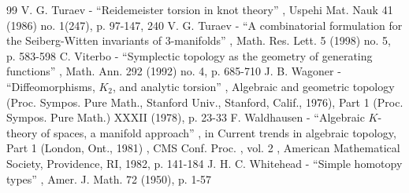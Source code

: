 \documentclass[11pt]{article}
\numberwithin{equation}{section}\providecommand{\dpl}{\displaystyle}
\begin{document}
\begin{thebibliography}{99}
 V. G. Turaev - “Reidemeister torsion in knot theory” , Uspehi Mat. Nauk 41 (1986) no. 1(247), p. 97-147, 240
 V. G. Turaev - “A combinatorial formulation for the Seiberg-Witten invariants of $3$-manifolds” , Math. Res. Lett. 5 (1998) no. 5, p. 583-598
 C. Viterbo - “Symplectic topology as the geometry of generating functions” , Math. Ann. 292 (1992) no. 4, p. 685-710
 J. B. Wagoner - “Diffeomorphisms, $K_{2}$, and analytic torsion” , Algebraic and geometric topology (Proc. Sympos. Pure Math., Stanford Univ., Stanford, Calif., 1976), Part 1 (Proc. Sympos. Pure Math.) XXXII (1978), p. 23-33
 F. Waldhausen - “Algebraic $K$-theory of spaces, a manifold approach” , in Current trends in algebraic topology, Part 1 (London, Ont., 1981) , CMS Conf. Proc. , vol. 2 , American Mathematical Society, Providence, RI, 1982, p. 141-184
 J. H. C. Whitehead - “Simple homotopy types” , Amer. J. Math. 72 (1950), p. 1-57
\end{thebibliography}
\end{document}
